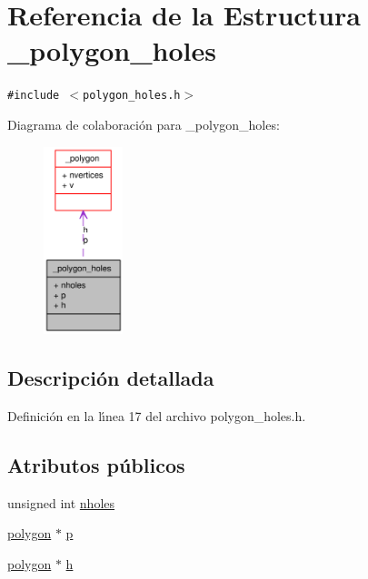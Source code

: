 \hypertarget{struct__polygon__holes}{
\section{Referencia de la Estructura \_\-polygon\_\-holes}
\label{struct__polygon__holes}
}
{\tt \#include $<$polygon\_\-holes.h$>$}

Diagrama de colaboraci\'{o}n para \_\-polygon\_\-holes:\begin{figure}[H]
\begin{center}
\leavevmode
\includegraphics[width=65pt]{struct__polygon__holes__coll__graph}
\end{center}
\end{figure}


\subsection{Descripci\'{o}n detallada}




Definici\'{o}n en la l\'{\i}nea 17 del archivo polygon\_\-holes.h.\subsection*{Atributos p\'{u}blicos}
\begin{CompactItemize}
\item 
unsigned int \hyperlink{struct__polygon__holes_dc7994045ce07712cf57b791ccaa0015_dc7994045ce07712cf57b791ccaa0015}{nholes}
\item 
\hyperlink{struct__polygon}{polygon} $\ast$ \hyperlink{struct__polygon__holes_90635c34b3613c8cf8cdda5bebe99638_90635c34b3613c8cf8cdda5bebe99638}{p}
\item 
\hyperlink{struct__polygon}{polygon} $\ast$ \hyperlink{struct__polygon__holes_b2a2b78ef53f56d9f4a7639c9dd15fd0_b2a2b78ef53f56d9f4a7639c9dd15fd0}{h}
\end{CompactItemize}



